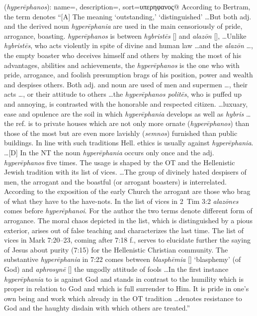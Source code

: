 \item[Haughty disdainer,]

(\textit{hyperēphanos}):
{
    name=,
    description={},
    sort=υπερηφανος@
}
According to Bertram, the term denotes ``[A] The meaning `outstanding,' `distinguished' \ldots But both adj. and the derived noun \emph{hyperēphania} are used in the main censoriously of pride, arrogance, boasting. \emph{hyperēphanos} is between \emph{hybristēs} [] and \emph{alazōn} [], \ldots Unlike \emph{hybristēs}, who acts violently in spite of divine and human law \ldots and the \emph{alazōn} \ldots, the empty boaster who deceives himself and others by making the most of his advantages, abilities and achievements, the \emph{hyperēphanos} is the one who with pride, arrogance, and foolish presumption brags of his position, power  and wealth and despises others. Both adj. and noun are used of men and supermen \ldots, their acts \ldots, or their attitude to others \ldots the \emph{hyperēphanos politēs}, who is puffed up and annoying, is contrasted with the honorable and respected citizen. \ldots luxuary, ease and opulence are the soil in which \emph{hyperēphania} develops as well as \emph{hybris} \ldots the ref. is to private houses which are not only more ornate (\emph{hyperēphanos}) than those of the most but are even more lavishly  (\emph{semnos}) furnished than public buildings. In line with such traditions Hell. ethics is usually against \emph{hyperēphania}. \ldots [D] In the NT the noun \emph{hyperēphania} occurs only once and the adj. \emph{hyperēphanos} five times. The usage is shaped by the OT and the Hellenistic Jewish tradition with its list of vices. \ldots The group of divinely hated despisers of men, the arrogant and the boastful (or arrogant boasters) is interrelated. According to the exposition of the early Church the arrogant are those who brag of what they have to the have-nots. In the list of vices in 2~Tim 3:2 \emph{alazōnes} comes before \emph{hyperēphanoi}. For the author the two terms denote different form of arrogance. The moral chaos depicted in the list, which is distinguished by a pious exterior, arises out of false teaching and characterizes the last time. The list of vices in Mark 7:20--23, coming after 7:18 f., serves to elucidate further the saying of Jesus about purity (7:15) for the Hellenistic Christian community. The substantive \emph{hyperēphania} in 7:22 comes between \emph{blasphēmia} [] `blasphemy' (of God) and \emph{aphrosynē} [] the ungodly attitude of fools \ldots In the first instance \emph{hyperēphania} to is against God and stands in contrast to the humility which is proper in relation to God and which is full surrender to Him. It is pride in one's own being and work which already in the OT tradition \ldots denotes resistance to God and the haughty disdain with which others are treated.''
